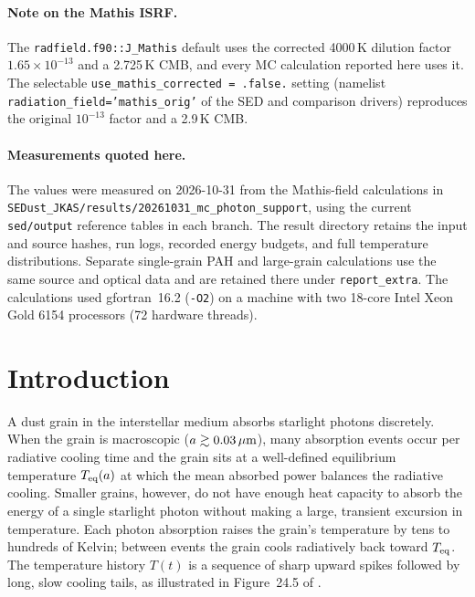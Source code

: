 \documentclass{my_memo}
\newcommand{\Teq}{T_{\rm eq}}
\newcommand{\umc}{\,\mu{\rm m}}
\begin{document}
\paragraph{Note on the Mathis ISRF.} The
\texttt{radfield.f90::J\_Mathis} default uses the corrected
4000\,K dilution factor $1.65\times10^{-13}$ and a 2.725\,K CMB, and
every MC calculation reported here uses it. The selectable
\texttt{use\_mathis\_corrected = .false.} setting (namelist
\texttt{radiation\_field='mathis\_orig'} of the SED and comparison
drivers) reproduces the original
$10^{-13}$ factor and a 2.9\,K CMB.

\paragraph{Measurements quoted here.} The values were measured on
2026-10-31 from the Mathis-field calculations in
\verb|SEDust_JKAS/results/20261031_mc_photon_support|, using the
current \verb|sed/output| reference tables in each branch. The result
directory retains the input and source hashes, run logs, recorded
energy budgets, and full temperature distributions. Separate
single-grain PAH and large-grain calculations use the same source
and optical data and are retained there under \verb|report_extra|.
The calculations used gfortran~16.2 (\texttt{-O2}) on a machine with
two 18-core Intel Xeon Gold 6154 processors (72 hardware threads).

\tableofcontents

\section{Introduction}

A dust grain in the interstellar medium absorbs starlight photons
discretely.  When the grain is macroscopic ($a \gtrsim 0.03\umc$),
many absorption events occur per radiative cooling time and the grain
sits at a well-defined equilibrium temperature $\Teq(a)$ at which the
mean absorbed power balances the radiative cooling.  Smaller grains,
however, do not have enough heat capacity to absorb the energy of a
single starlight photon without making a large, transient excursion
in temperature.  Each photon absorption raises the grain's
temperature by tens to hundreds of Kelvin; between events the grain
cools radiatively back toward $\Teq$.  The temperature history $T(t)$
is a sequence of sharp upward spikes followed by long, slow
cooling tails, as illustrated in Figure~24.5 of \citet{DrainePIIM2011}.
\end{document}

